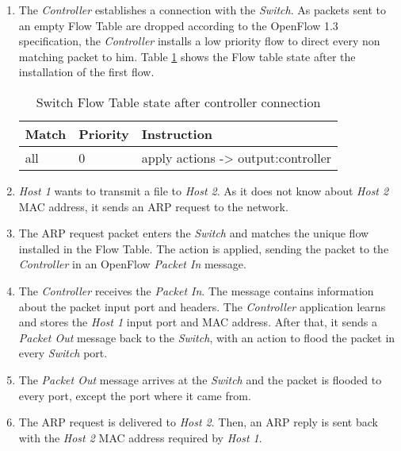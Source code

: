 \begin{enumerate}

\item The \textit{Controller} establishes a connection with the \textit{Switch}. As packets sent to an empty Flow Table are dropped according to the OpenFlow 1.3 specification, the  \textit{Controller} installs a low priority flow to direct every non matching packet to him. Table \ref{tab:initialtable} shows the Flow table state after the installation of the first flow.  

\begin{table}[h]
\centering
\caption{Switch Flow Table state after controller connection}
\label{tab:initialtable}
\begin{tabular}{|l|l|l|}
\hline
\textbf{Match}  & \textbf{Priority} & \textbf{Instruction}                              \\ \hline
all             & 0                 & apply actions -> output:controller                \\ \hline
\end{tabular}
\end{table}

\item \textit{Host 1} wants to transmit a file to \textit{Host 2}. As it does not know about \textit{Host 2} MAC address, it sends an ARP \cite{rfc826} request to the network.

\item The ARP request packet enters the \textit{Switch} and matches the unique flow installed in the Flow Table. The action is applied, sending the packet to the  \textit{Controller} in an OpenFlow \textit{Packet In} message.

\item The  \textit{Controller} receives the \textit{Packet In}. The message contains information about the packet input port and headers. The  \textit{Controller} application learns and stores the \textit{Host 1} input port and MAC address. After that, it sends a \textit{Packet Out} message back to the \textit{Switch}, with an action to flood the packet in every \textit{Switch} port.   

\item The \textit{Packet Out} message arrives at the \textit{Switch} and the packet is flooded to every port, except the port where it came from.

\item The ARP request is delivered to \textit{Host 2}. Then, an ARP reply is sent back with the \textit{Host 2} MAC address required by \textit{Host 1}.


\end{enumerate}
